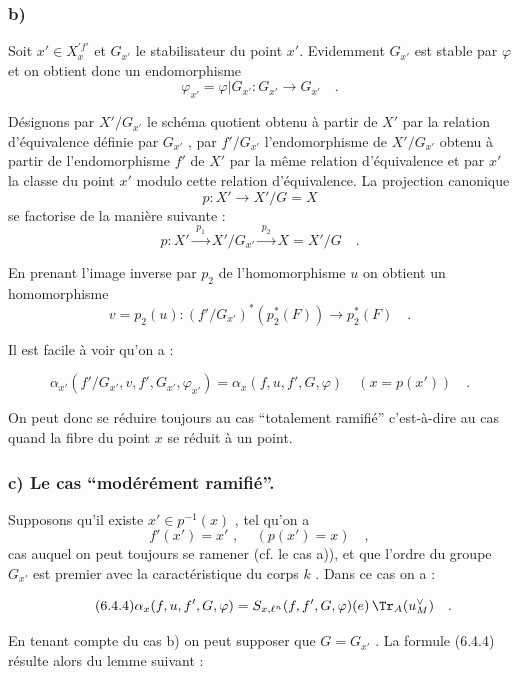 \subsubsection*{b)} Soit $x'\in X_x^{\prime f'}$ et $G_{x'}$ le stabilisateur du point $x'$. Evidemment $G_{x'}$ est stable par $\varphi$ et on obtient donc un endomorphisme\[
\varphi_{x'} = \varphi|G_{x'} : G_{x'} \longrightarrow G_{x'} \quad .
\]

Désignons par $X'/G_{x'}$ le schéma quotient obtenu à partir de $X'$ par la relation d'équivalence définie par $G_{x'}$ , par $f'/G_{x'}$ l'endomorphisme de $X'/G_{x'}$ obtenu à partir de l'endomorphisme $f'$ de $X'$ par la même relation d'équivalence et par $x'$ la classe du point $x'$ modulo cette relation d'équivalence.
La
projection canonique
\[
p : X' \longrightarrow X'/G = X
\]
se factorise de la manière suivante :
\[
p : X' \xrightarrow{\;p_1\;} X'/G_{x'} \xrightarrow{\;p_2\;} X = X'/G \quad .
\]

En prenant l'image inverse par $p_2$ de l'homomorphisme $u$ on obtient un homomorphisme
\[
v = p_2(u) : (f'/G_{x'})^*(p_2^*(F)) \longrightarrow p_2^*(F) \quad .
\]

Il est facile à voir qu'on a :

\begin{equation}\tag{6.4.3}
\alpha_{x'}(f'/G_{x'}, v, f', G_{x'}, \varphi_{x'}) = \alpha_x(f,u, f', G, \varphi) \quad (x = p(x')) \quad .
\end{equation}

On peut donc se réduire toujours au cas ``totalement ramifié'' c'est-à-dire au cas quand la fibre du point $x$ se réduit à un point.

\subsubsection*{c) Le cas ``modérément ramifié''.} Supposons qu'il existe $x' \in p^{-1}(x)$ , tel qu'on a
\[
f'(x') = x' \text{ , } \quad (p(x') = x) \quad ,
\]
cas auquel on peut toujours se ramener (cf. le cas a)), et que l'ordre du groupe $G_{x'}$ est premier avec la caractéristique du corps $k$ . Dans ce cas on a :

\begin{equation}\tag{6.4.4}
\alpha_x(f,u, f', G, \varphi) = S_{x,\ell^n}(f, f', G, \varphi)(e) \, \Tr_A(u_M^\vee) \quad .
\end{equation}

En tenant compte du cas b) on peut supposer que $G = G_{x'}$ . La formule (6.4.4) résulte alors du lemme suivant :

